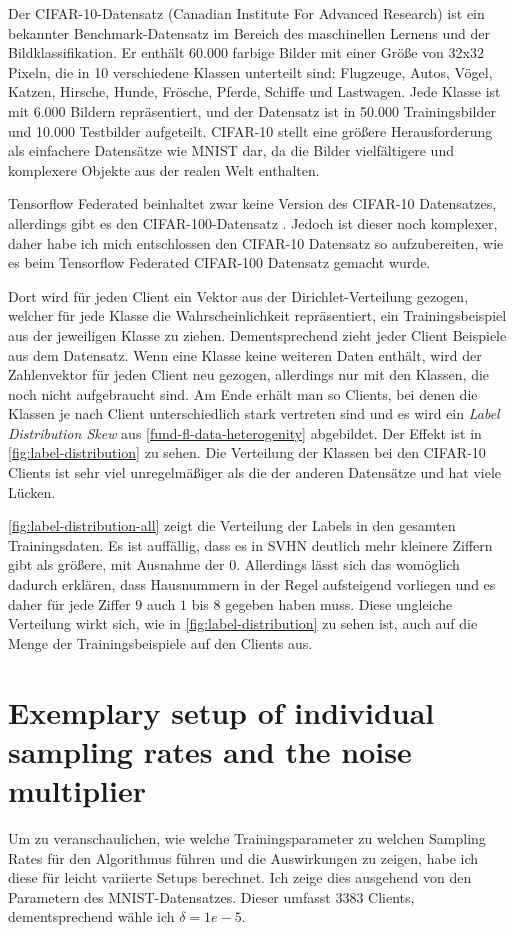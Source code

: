 Der CIFAR-10-Datensatz (Canadian Institute For Advanced Research) ist ein bekannter Benchmark-Datensatz im Bereich des maschinellen Lernens und der Bildklassifikation. Er enthält 60.000 farbige Bilder mit einer Größe von 32x32 Pixeln, die in 10 verschiedene Klassen unterteilt sind: Flugzeuge, Autos, Vögel, Katzen, Hirsche, Hunde, Frösche, Pferde, Schiffe und Lastwagen. Jede Klasse ist mit 6.000 Bildern repräsentiert, und der Datensatz ist in 50.000 Trainingsbilder und 10.000 Testbilder aufgeteilt. CIFAR-10 stellt eine größere Herausforderung als einfachere Datensätze wie MNIST dar, da die Bilder vielfältigere und komplexere Objekte aus der realen Welt enthalten. 

Tensorflow Federated beinhaltet zwar keine Version des CIFAR-10 Datensatzes, allerdings gibt es den CIFAR-100-Datensatz \cite{krizhevsky:2009}. Jedoch ist dieser noch komplexer, daher habe ich mich entschlossen den CIFAR-10 Datensatz so aufzubereiten, wie es beim Tensorflow Federated CIFAR-100 Datensatz gemacht wurde. 

Dort wird für jeden Client ein Vektor aus der Dirichlet-Verteilung gezogen, welcher für jede Klasse die Wahrscheinlichkeit repräsentiert, ein Trainingsbeispiel aus der jeweiligen Klasse zu ziehen. Dementsprechend zieht jeder Client Beispiele aus dem Datensatz. Wenn eine Klasse keine weiteren Daten enthält, wird der Zahlenvektor für jeden Client neu gezogen, allerdings nur mit den Klassen, die noch nicht aufgebraucht sind. Am Ende erhält man so Clients, bei denen die Klassen je nach Client unterschiedlich stark vertreten sind und es wird ein \textit{Label Distribution Skew} aus \autoref{fund-fl-data-heterogenity} abgebildet. Der Effekt ist in \autoref{fig:label-distribution} zu sehen. Die Verteilung der Klassen bei den CIFAR-10 Clients ist sehr viel unregelmäßiger als die der anderen Datensätze und hat viele Lücken.

\autoref{fig:label-distribution-all} zeigt die Verteilung der Labels in den gesamten Trainingsdaten. Es ist auffällig, dass es in SVHN deutlich mehr kleinere Ziffern gibt als größere, mit Ausnahme der $0$. Allerdings lässt sich das womöglich dadurch erklären, dass Hausnummern in der Regel aufsteigend vorliegen und es daher für jede Ziffer $9$ auch $1$ bis $8$ gegeben haben muss. Diese ungleiche Verteilung wirkt sich, wie in \autoref{fig:label-distribution} zu sehen ist, auch auf die Menge der Trainingsbeispiele auf den Clients aus.

\section{Exemplary setup of individual sampling rates and the noise multiplier}
Um zu veranschaulichen, wie welche Trainingsparameter zu welchen Sampling Rates für den Algorithmus führen und die Auswirkungen zu zeigen, habe ich diese für leicht variierte Setups berechnet. Ich zeige dies ausgehend von den Parametern des MNIST-Datensatzes. Dieser umfasst $3383$ Clients, dementsprechend wähle ich $\delta= 1e-5$. 

